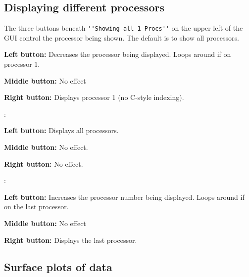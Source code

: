 \subsection{Displaying different processors}

The three buttons beneath \verb+''Showing all 1 Procs''+ on the upper left of the GUI control the processor
being shown.  The default is to show all processors.  
\begin{list}{}
\item \button{$<--$}
\begin{list}{}
\item {\bf Left button:} Decreases the processor being displayed.  Loops around if on processor 1.
\item {\bf Middle button:} No effect
\item {\bf Right button:} Displays processor 1 (no C-style indexing).
\end{list}
\item {}:
\begin{list}{}
\item {\bf Left button:} Displays all processors.
\item {\bf Middle button:} No effect.
\item {\bf Right button:} No effect.
\end{list}
\item \button{$-->$}:
\begin{list}{}
\item {\bf Left button:} Increases the processor number being displayed.  Loops around if on the last processor.
\item {\bf Middle button:} No effect
\item {\bf Right button:} Displays the last processor.
\end{list}
\end{list}

\subsection{Surface plots of data}

